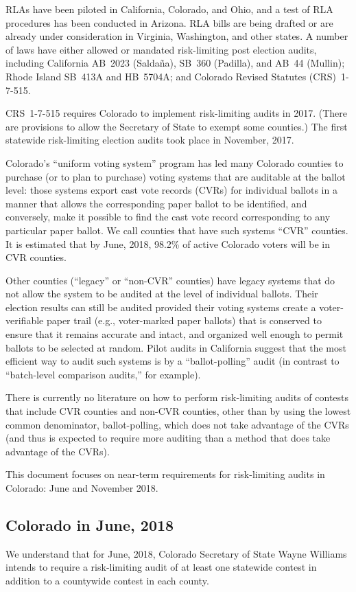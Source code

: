 \documentclass[12pt]{article}
\begin{document}
RLAs have been piloted in California, Colorado, and Ohio, and a test of
RLA procedures has been conducted in Arizona.
RLA bills are being drafted or are already under consideration in Virginia, Washington, and other states.
A number of laws have either allowed or mandated risk-limiting post election audits,
including California AB~2023 (Salda\~{n}a), SB~360 (Padilla), and AB~44 (Mullin);
Rhode Island SB~413A and HB~5704A; and Colorado Revised Statutes (CRS)~1-7-515.

CRS~1-7-515 requires 
Colorado to implement risk-limiting audits in 2017.
(There are provisions to allow the Secretary of State to exempt some counties.)
The first statewide risk-limiting election audits took place in November, 2017. 

Colorado's ``uniform voting system'' program has led
many Colorado counties to purchase (or to plan to purchase) voting systems
that are auditable at the ballot level: those systems export cast vote records (CVRs)
for individual ballots in a manner that allows the corresponding paper ballot to be identified,
and conversely, make it possible to find the cast vote record corresponding to any
particular paper ballot.
We call counties that have such systems ``CVR'' counties.
It is estimated that by June, 2018, 98.2\% of active Colorado voters will be in CVR counties.

Other counties (``legacy'' or ``non-CVR'' counties) 
have legacy systems that do not allow the system to be audited
at the level of individual ballots.
Their election results can still be audited provided their voting systems
create a voter-verifiable paper trail (e.g., voter-marked paper ballots) that is
conserved to ensure that it remains accurate and intact, and organized well enough
to permit ballots to be selected at random.
Pilot audits in California suggest that the most efficient way to audit such systems
is by a ``ballot-polling'' audit 
(in contrast to ``batch-level comparison audits,'' for example).

There is currently no literature on how to perform risk-limiting audits of contests
that include CVR counties and non-CVR counties, other than by using the lowest
common denominator, ballot-polling, which does not take advantage of the CVRs
(and thus is expected to require more auditing than a method that does take
advantage of the CVRs).

This document focuses on near-term requirements for risk-limiting audits in Colorado: June and November 2018.

\subsection{Colorado in June, 2018}
We understand that for June, 2018, Colorado Secretary of State Wayne Williams intends to require
a risk-limiting audit of at least one statewide contest in addition
to a countywide contest in each county.
\end{document}
